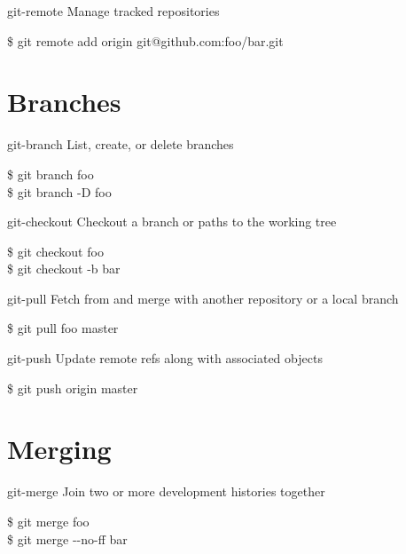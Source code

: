 \documentclass{beamer}
\begin{document}
\begin{frame}{git-remote}
  Manage tracked repositories
  \begin{Example}
    \$ git remote add origin git@github.com:foo/bar.git
  \end{Example}
\end{frame}

\section{Branches}

\begin{frame}{git-branch}
  List, create, or delete branches
  \begin{Example}
    \$ git branch foo \\
    \$ git branch -D foo
  \end{Example}
\end{frame}

\begin{frame}{git-checkout}
  Checkout a branch or paths to the working tree
  \begin{Example}
    \$ git checkout foo \\
    \$ git checkout -b bar
  \end{Example}
\end{frame}

\begin{frame}{git-pull}
  Fetch from and merge with another repository or a local branch
  \begin{Example}
    \$ git pull foo master
  \end{Example}
\end{frame}

\begin{frame}{git-push}
  Update remote refs along with associated objects
  \begin{Example}
    \$ git push origin master
  \end{Example}
\end{frame}

\section{Merging}

\begin{frame}{git-merge}
  Join two or more development histories together
  \begin{Example}
    \$ git merge foo \\
    \$ git merge -{}-no-ff bar
  \end{Example}
\end{frame}
\end{document}
